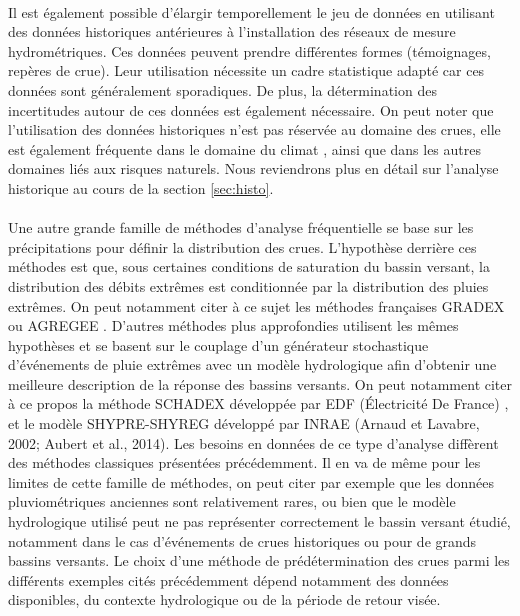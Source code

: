 \documentclass[11pt]{article}
\begin{document}
	\paragraph{} Il est également possible d'élargir temporellement le jeu de données en utilisant des données historiques antérieures à l'installation des réseaux de mesure hydrométriques. Ces données peuvent prendre différentes formes (témoignages, repères de crue). Leur utilisation nécessite un cadre statistique adapté car ces données sont généralement sporadiques. De plus, la détermination des incertitudes autour de ces données est également nécessaire. On peut noter que l'utilisation des données historiques n'est pas réservée au domaine des crues, elle est également fréquente dans le domaine du climat \citep{ribes_making_2021}, ainsi que dans les autres domaines liés aux risques naturels. Nous reviendrons plus en détail sur l'analyse historique au cours de la section \ref{sec:histo}.
	
	\paragraph{} Une autre grande famille de méthodes d'analyse fréquentielle se base sur les précipitations pour définir la distribution des crues. L'hypothèse derrière ces méthodes est que, sous certaines conditions de saturation du bassin versant, la distribution des débits extrêmes est conditionnée par la distribution des pluies extrêmes. On peut notamment citer à ce sujet les méthodes françaises GRADEX \citep{guillot_methode_1967} ou AGREGEE \citep{margoum_estimation_1994}. D'autres méthodes plus approfondies utilisent les mêmes hypothèses et se basent sur le couplage d'un générateur stochastique d'événements de pluie extrêmes avec un modèle hydrologique afin d'obtenir une meilleure description de la réponse des bassins versants. On peut notamment citer à ce propos la méthode SCHADEX développée par EDF (Électricité De France) \citep{paquet_schadex_2013}, et le modèle SHYPRE-SHYREG développé par INRAE (Arnaud et Lavabre, 2002; Aubert et al., 2014). Les besoins en données de ce type d'analyse diffèrent des méthodes classiques présentées précédemment. Il en va de même pour les limites de cette famille de méthodes, on peut citer par exemple que les données pluviométriques anciennes sont relativement rares, ou bien que le modèle hydrologique utilisé peut ne pas représenter correctement le bassin versant étudié, notamment dans le cas d'événements de crues historiques ou pour de grands bassins versants. Le choix d'une méthode de prédétermination des crues parmi les différents exemples cités précédemment dépend notamment des données disponibles, du contexte hydrologique ou de la période de retour visée.
		
\end{document}
